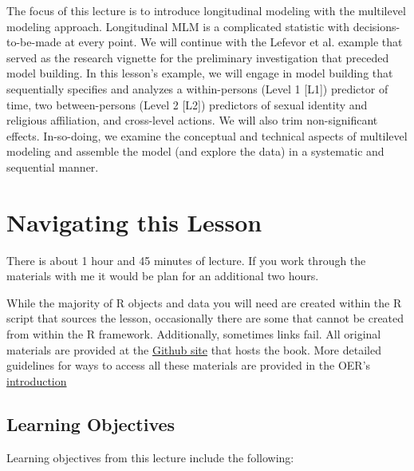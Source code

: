 \documentclass[
  11pt,
]{book}
\begin{document}
The focus of this lecture is to introduce longitudinal modeling with the multilevel modeling approach. Longitudinal MLM is a complicated statistic with decisions-to-be-made at every point. We will continue with the Lefevor et al. \citeyearpar{lefevor_religious_2017} example that served as the research vignette for the preliminary investigation that preceded model building. In this lesson's example, we will engage in model building that sequentially specifies and analyzes a within-persons (Level 1 {[}L1{]}) predictor of time, two between-persons (Level 2 {[}L2{]}) predictors of sexual identity and religious affiliation, and cross-level actions. We will also trim non-significant effects. In-so-doing, we examine the conceptual and technical aspects of multilevel modeling and assemble the model (and explore the data) in a systematic and sequential manner.

\hypertarget{navigating-this-lesson-2}{%
\section{Navigating this Lesson}\label{navigating-this-lesson-2}}

There is about 1 hour and 45 minutes of lecture. If you work through the materials with me it would be plan for an additional two hours.

While the majority of R objects and data you will need are created within the R script that sources the lesson, occasionally there are some that cannot be created from within the R framework. Additionally, sometimes links fail. All original materials are provided at the \href{https://github.com/lhbikos/ReC_CPA}{Github site} that hosts the book. More detailed guidelines for ways to access all these materials are provided in the OER's \protect\hyperlink{ReCintro}{introduction}

\hypertarget{learning-objectives-2}{%
\subsection{Learning Objectives}\label{learning-objectives-2}}

Learning objectives from this lecture include the following:
\end{document}
